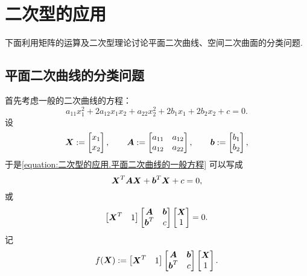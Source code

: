 \section{二次型的应用}
下面利用矩阵的运算及二次型理论讨论平面二次曲线、空间二次曲面的分类问题.

\subsection{平面二次曲线的分类问题}
首先考虑一般的二次曲线的方程：\begin{equation}\label{equation:二次型的应用.平面二次曲线的一般方程}
	a_{11} x_1^2
	+ 2 a_{12} x_1 x_2
	+ a_{22} x_2^2
	+ 2 b_1 x_1
	+ 2 b_2 x_2
	+ c
	= 0.
\end{equation}
设\begin{equation*}
	\boldsymbol{X}
	:= \begin{bmatrix}
		x_1 \\ x_2
	\end{bmatrix},
	\qquad
	\boldsymbol{A}
	:= \begin{bmatrix}
		a_{11} & a_{12} \\
		a_{12} & a_{22}
	\end{bmatrix},
	\qquad
	\boldsymbol{b}
	:= \begin{bmatrix}
		b_1 \\ b_2
	\end{bmatrix},
\end{equation*}
于是\cref{equation:二次型的应用.平面二次曲线的一般方程} 可以写成\begin{equation*}
	\boldsymbol{X}^T \boldsymbol{A} \boldsymbol{X}
	+ \boldsymbol{b}^T \boldsymbol{X}
	+ c
	= 0,
\end{equation*}
或\begin{equation}\label{equation:二次型的应用.平面二次曲线的一般方程.矩阵形式}
	\begin{bmatrix}
		\boldsymbol{X}^T & 1
	\end{bmatrix}
	\begin{bmatrix}
		\boldsymbol{A} & \boldsymbol{b} \\
		\boldsymbol{b}^T & c
	\end{bmatrix}
	\begin{bmatrix}
		\boldsymbol{X} \\ 1
	\end{bmatrix}
	= 0.
\end{equation}
记\begin{equation*}
	f(\boldsymbol{X})
	:=
	\begin{bmatrix}
		\boldsymbol{X}^T & 1
	\end{bmatrix}
	\begin{bmatrix}
		\boldsymbol{A} & \boldsymbol{b} \\
		\boldsymbol{b}^T & c
	\end{bmatrix}
	\begin{bmatrix}
		\boldsymbol{X} \\ 1
	\end{bmatrix}.
\end{equation*}
